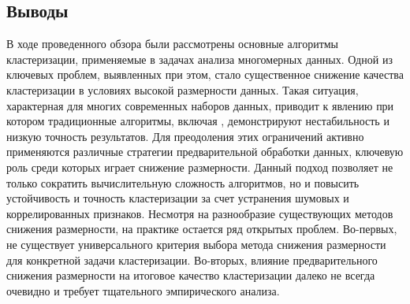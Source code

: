     \subsection{Выводы}
        В ходе проведенного обзора были рассмотрены основные алгоритмы кластеризации, применяемые в задачах анализа многомерных данных. Одной из ключевых проблем, выявленных при этом, стало существенное снижение качества кластеризации в условиях высокой размерности данных. Такая ситуация, характерная для многих современных наборов данных, приводит к явлению при котором традиционные алгоритмы, включая \kmeans{}, демонстрируют нестабильность и низкую точность результатов.
        Для преодоления этих ограничений активно применяются различные стратегии предварительной обработки данных, ключевую роль среди которых играет снижение размерности. Данный подход позволяет не только сократить вычислительную сложность алгоритмов, но и повысить устойчивость и точность кластеризации за счет устранения шумовых и коррелированных признаков.
        Несмотря на разнообразие существующих методов снижения размерности, на практике остается ряд открытых проблем. Во-первых, не существует универсального критерия выбора метода снижения размерности для конкретной задачи кластеризации. Во-вторых, влияние предварительного снижения размерности на итоговое качество кластеризации далеко не всегда очевидно и требует тщательного эмпирического анализа.
